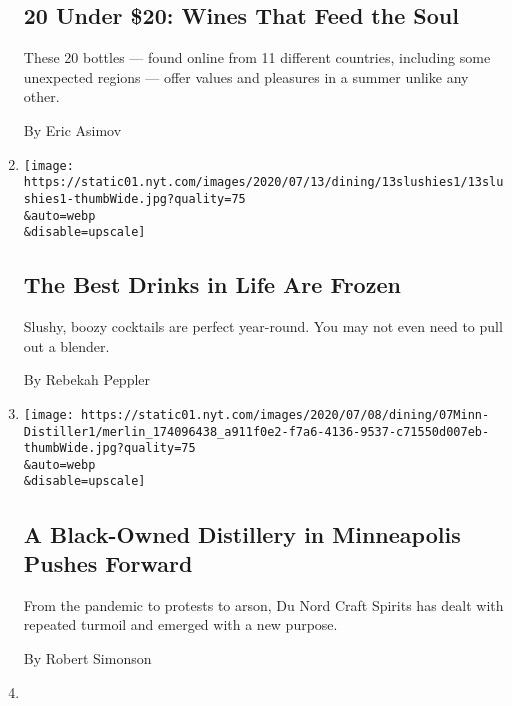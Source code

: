 \begin{enumerate}
  \hypertarget{20-under-20-wines-that-feed-the-soul}{%
  \subsection{20 Under \$20: Wines That Feed the
  Soul}\label{20-under-20-wines-that-feed-the-soul}}

  These 20 bottles --- found online from 11 different countries,
  including some unexpected regions --- offer values and pleasures in a
  summer unlike any other.

  By Eric Asimov
\item
  \href{/2020/07/10/dining/drinks/frozen-drink-recipes.html}{}

  \texttt{[image: https://static01.nyt.com/images/2020/07/13/dining/13slushies1/13slushies1-thumbWide.jpg?quality=75\\\&auto=webp\\\&disable=upscale]}

  \hypertarget{the-best-drinks-in-life-are-frozen}{%
  \subsection{The Best Drinks in Life Are
  Frozen}\label{the-best-drinks-in-life-are-frozen}}

  Slushy, boozy cocktails are perfect year-round. You may not even need
  to pull out a blender.

  By Rebekah Peppler
\item
  \href{/2020/07/07/dining/drinks/du-nord-black-owned-distillery-minneapolis.html}{}

  \texttt{[image: https://static01.nyt.com/images/2020/07/08/dining/07Minn-Distiller1/merlin\_174096438\_a911f0e2-f7a6-4136-9537-c71550d007eb-thumbWide.jpg?quality=75\\\&auto=webp\\\&disable=upscale]}

  \hypertarget{a-black-owned-distillery-in-minneapolis-pushes-forward}{%
  \subsection{A Black-Owned Distillery in Minneapolis Pushes
  Forward}\label{a-black-owned-distillery-in-minneapolis-pushes-forward}}

  From the pandemic to protests to arson, Du Nord Craft Spirits has
  dealt with repeated turmoil and emerged with a new purpose.

  By Robert Simonson
\item
  \href{/2020/07/02/dining/drinks/wine-school-assignment-verdicchio-di-matelica.html}{}


\end{enumerate}

